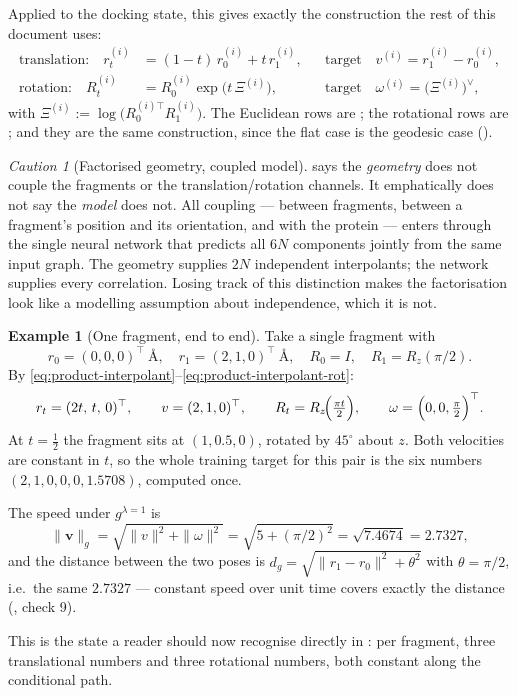 \documentclass[11pt,a4paper]{report}
\theoremstyle{definition}
\newtheorem{example}[example]{Example}
\theoremstyle{remark}
\newtheorem{caution}[caution]{Caution}
\begin{document}
Applied to the docking state, this gives exactly the construction the rest
of this document uses:
\begin{align}
\label{eq:product-interpolant}
\text{translation:}\quad
r^{(i)}_t &= (1-t)\,r^{(i)}_0 + t\,r^{(i)}_1 ,
&&\text{target}\quad v^{(i)} = r^{(i)}_1-r^{(i)}_0 ,
\\[0.5ex]
\label{eq:product-interpolant-rot}
\text{rotation:}\quad
R^{(i)}_t &= R^{(i)}_0\exp\bigl(t\,\Xi^{(i)}\bigr) ,
&&\text{target}\quad \omega^{(i)} = \bigl(\Xi^{(i)}\bigr)^\vee ,
\end{align}
with $\Xi^{(i)}:=\log\bigl(R^{(i)\top}_0R^{(i)}_1\bigr)$.
The Euclidean rows are ; the rotational rows
are ; and they are the same construction,
since the flat case is the geodesic case ().

\begin{caution}[Factorised geometry, coupled model]
\label{caution:product-coupling}
 says the \emph{geometry} does not couple the
fragments or the translation/rotation channels. It emphatically does not say
the \emph{model} does not. All coupling --- between fragments, between a
fragment's position and its orientation, and with the protein --- enters
through the single neural network that predicts all $6N$ components jointly
from the same input graph. The geometry supplies $2N$ independent
interpolants; the network supplies every correlation. Losing track of this
distinction makes the factorisation look like a modelling assumption about
independence, which it is not.
\end{caution}

\begin{example}[One fragment, end to end]
\label{ex:rfm-product-numeric}
Take a single fragment with
\[
r_0=(0,0,0)^\top\ \text{\AA},
\quad
r_1=(2,1,0)^\top\ \text{\AA},
\quad
R_0=I,
\quad
R_1=R_z(\pi/2) .
\]
By \eqref{eq:product-interpolant}--\eqref{eq:product-interpolant-rot}:
\[
r_t=(2t,\,t,\,0)^\top,
\qquad
v=(2,1,0)^\top,
\qquad
R_t=R_z\!\Bigl(\tfrac{\pi t}{2}\Bigr),
\qquad
\omega=\Bigl(0,0,\tfrac\pi2\Bigr)^\top .
\]
At $t=\tfrac12$ the fragment sits at $(1,0.5,0)$, rotated by $45^\circ$
about $z$. Both velocities are constant in $t$, so the whole training target
for this pair is the six numbers $(2,1,0,0,0,1.5708)$, computed once.

The speed under $g^{\lambda=1}$ is
\[
\|\mathbf v\|_g = \sqrt{\|v\|^2+\|\omega\|^2}
= \sqrt{5 + (\pi/2)^2} = \sqrt{7.4674} = 2.7327 ,
\]
and the distance between the two poses is
$d_g = \sqrt{\|r_1-r_0\|^2+\theta^2}$ with $\theta=\pi/2$, i.e.\ the same
$2.7327$ \checkmark --- constant speed over unit time covers exactly the
distance (, check 9).

This is the state a reader should now recognise directly in
: per fragment, three translational numbers and three
rotational numbers, both constant along the conditional path.
\end{example}
\end{document}
